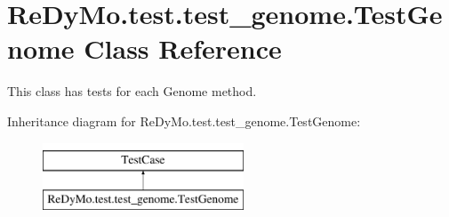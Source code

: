 \hypertarget{classReDyMo_1_1test_1_1test__genome_1_1TestGenome}{}\section{Re\+Dy\+Mo.\+test.\+test\+\_\+genome.\+Test\+Genome Class Reference}
\label{classReDyMo_1_1test_1_1test__genome_1_1TestGenome}


This class has tests for each Genome method.  


Inheritance diagram for Re\+Dy\+Mo.\+test.\+test\+\_\+genome.\+Test\+Genome\+:\begin{figure}[H]
\begin{center}
\leavevmode
\includegraphics[height=2.000000cm]{classReDyMo_1_1test_1_1test__genome_1_1TestGenome}
\end{center}
\end{figure}
